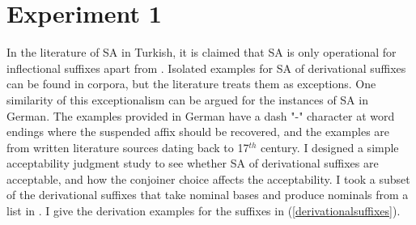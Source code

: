 




\section{Experiment 1}

In the literature of SA in Turkish, it is claimed that SA is only operational for inflectional suffixes \citep{orgun1995flat,kornfilt1996some,broadwell2008turkish, kornfilt2012revisiting} apart from \cite{akkucs2016suspended}. Isolated examples for SA of derivational suffixes can be found in corpora, but the literature treats them as exceptions. One similarity of this exceptionalism can be argued for the instances of SA in German. The examples provided in German \citep{pounder2006broken} have a dash "-" character at word endings where the suspended affix should be recovered, and the examples are from written literature sources dating back to 17$^{th}$ century. I designed a simple acceptability judgment study to see whether SA of derivational suffixes are acceptable, and how the conjoiner choice affects the acceptability. I took a subset of the derivational suffixes that take nominal bases and produce nominals from a list in \cite{goksel2004turkish}. I give the derivation examples for the suffixes in (\ref{derivationalsuffixes}).  


